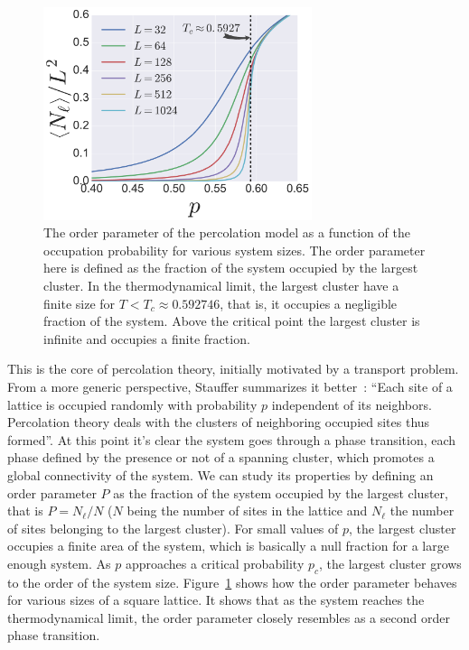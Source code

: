 \begin{figure}[h]
\begin{center}
    \includegraphics[width=0.7\textwidth]{chapters/ch2-crit/figs/isoperco2}
\end{center}
\caption{The order parameter of the percolation model as a function of the
    occupation probability for various system sizes. The order parameter here
    is defined as the fraction of the system occupied by the largest cluster.
    In the thermodynamical limit, the largest cluster have a finite size for
    $T<T_c\approx 0.592746$, that is, it occupies a negligible fraction of the
    system. Above the critical point the largest cluster is infinite and occupies
    a finite fraction.}
\label{fig:isoperco2}
\end{figure}

This is the core of percolation theory, initially motivated by a transport
problem. From a more generic perspective, Stauffer summarizes it
better~\cite{Stauffer1994}: ``Each site of a lattice is occupied randomly with
probability $p$ independent of its neighbors. Percolation theory deals with the
clusters of neighboring occupied sites thus formed''. At this point it's clear
the system goes through a phase transition, each phase defined by the presence
or not of a spanning cluster, which promotes a global connectivity of the
system. We can study its properties by defining an order parameter $P$ as the
fraction of the system occupied by the largest cluster, that is $P=N_\ell/N$
($N$ being the number of sites in the lattice and $N_\ell$ the number of sites
belonging to the largest cluster). For small values of $p$, the largest cluster
occupies a finite area of the system, which is basically a null fraction for a
large enough system. As $p$ approaches a critical probability $p_c$, the
largest cluster grows to the order of the system size.
Figure~\ref{fig:isoperco2} shows how the order parameter behaves for various
sizes of a square lattice. It shows that as the system reaches the
thermodynamical limit, the order parameter closely resembles as a second order
phase transition.

